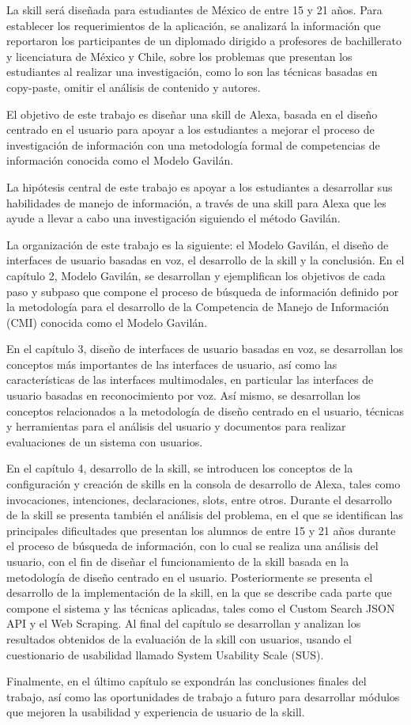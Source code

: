 La skill será diseñada para estudiantes de México de entre 15 y 21 años. Para establecer los requerimientos de la aplicación, se analizará la información que reportaron los participantes de un diplomado dirigido a profesores de bachillerato y licenciatura de México y Chile, sobre los problemas que presentan los estudiantes al realizar una investigación, como lo son las técnicas basadas en copy-paste, omitir el análisis de contenido y autores.

El objetivo de este trabajo es diseñar una skill de Alexa, basada en el diseño centrado en el usuario para apoyar a los estudiantes a mejorar el proceso de investigación de información con una metodología formal de competencias de información conocida como el Modelo Gavilán.

La hipótesis central de este trabajo es apoyar a los estudiantes a desarrollar sus habilidades de manejo de información, a través de una skill para Alexa que les ayude a llevar a cabo una investigación siguiendo el método Gavilán.

La organización de este trabajo es la siguiente: el Modelo Gavilán, el diseño de interfaces de usuario basadas en voz, el desarrollo de la skill y la conclusión. En el capítulo 2, Modelo Gavilán, se desarrollan y ejemplifican los objetivos de cada paso y subpaso que compone el proceso de búsqueda de información definido por la metodología para el desarrollo de la Competencia de Manejo de Información (CMI) conocida como el Modelo Gavilán.

En el capítulo 3, diseño de interfaces de usuario basadas en voz, se desarrollan los conceptos más importantes de las interfaces de usuario, así como las características de las interfaces multimodales, en particular las interfaces de usuario basadas en reconocimiento por voz. Así mismo, se desarrollan los conceptos relacionados a la metodología de diseño centrado en el usuario, técnicas y herramientas para el análisis del usuario y documentos para realizar evaluaciones de un sistema con usuarios.

En el capítulo 4, desarrollo de la skill, se introducen los conceptos de la configuración y creación de skills en la consola de desarrollo de Alexa, tales como invocaciones, intenciones, declaraciones, slots, entre otros. Durante el desarrollo de la skill se presenta también el análisis del problema, en el que se identifican las principales dificultades que presentan los alumnos de entre 15 y 21 años durante el proceso de búsqueda de información, con lo cual se realiza una análisis del usuario, con el fin de diseñar el funcionamiento de la skill basada en la metodología de diseño centrado en el usuario. Posteriormente se presenta el desarrollo de la implementación de la skill, en la que se describe cada parte que compone el sistema y las técnicas aplicadas, tales como el Custom Search JSON API y el Web Scraping. Al final del capítulo se desarrollan y analizan los resultados obtenidos de la evaluación de la skill con usuarios, usando el cuestionario de usabilidad llamado System Usability Scale (SUS).

Finalmente, en el último capítulo se expondrán las conclusiones finales del trabajo, así como las oportunidades de trabajo a futuro para desarrollar módulos que mejoren la usabilidad y experiencia de usuario de la skill.
